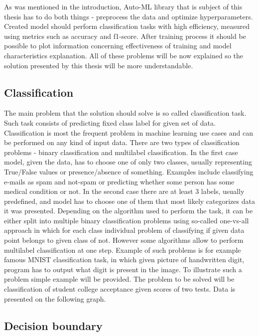 \documentclass[a4paper,twoside,12pt]{book}
\begin{document}
As was mentioned in the introduction, Auto-ML library that is subject of this thesis has to do both things - preprocess the data and optimize hyperparameters. Created model should perform classification tasks with high efficiency, measured using metrics such as accuracy and f1-score.
After training process it should be possible to plot information concerning effectiveness of training and model characteristics explanation.
All of these problems will be now explained so the solution presented by this thesis will be more understandable.

\subsection{Classification}

The main problem that the solution should solve is so called classification task. Such task consists of predicting fixed class label for given set of data. Classification is most the frequent problem in machine learning use cases and can be performed on any kind of input data. There are two types of classification problems - binary classification and multilabel classification.
In the first case model, given the data, has to choose one of only two classes, usually representing True/False values or presence/absence of something. Examples include classifying e-mails as spam and not-spam or predicting whether some person has some medical condition or not.
In the second case there are at least 3 labels, usually predefined, and model has to choose one of them that most likely categorizes data it was presented. Depending on the algorithm used to perform the task, it can be either split into multiple binary classification problems using so-called one-vs-all approach in which for each class individual problem of classifying if given data point belongs to given class of not. However some algorithms allow to perform multilabel classification at one step. Example of such problems is for example famous MNIST classification task, in which given picture of handwritten digit, program has to output what digit is present in the image.
To illustrate such a problem simple example will be provided. The problem to be solved will be classification of student college acceptance given scores of two tests. Data is presented on the following graph.

\subsection{Decision boundary}
\end{document}
